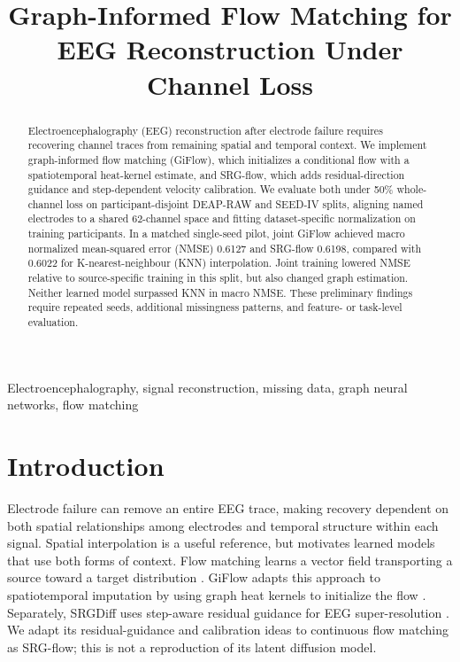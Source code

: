 \documentclass{article}
\title{Graph-Informed Flow Matching for EEG Reconstruction Under Channel Loss}
\begin{document}
\maketitle

\begin{abstract}
Electroencephalography (EEG) reconstruction after electrode failure requires
recovering channel traces from remaining spatial and temporal context. We
implement graph-informed flow matching (GiFlow), which initializes a
conditional flow with a spatiotemporal heat-kernel estimate, and SRG-flow,
which adds residual-direction guidance and step-dependent velocity
calibration. We evaluate both under 50\% whole-channel loss on
participant-disjoint DEAP-RAW and SEED-IV splits, aligning named electrodes
to a shared 62-channel space and fitting dataset-specific normalization on
training participants. In a matched single-seed pilot, joint GiFlow achieved
macro normalized mean-squared error (NMSE) 0.6127 and SRG-flow 0.6198,
compared with 0.6022 for K-nearest-neighbour (KNN) interpolation. Joint
training lowered NMSE relative to source-specific training in this split,
but also changed graph estimation. Neither learned model surpassed KNN in
macro NMSE. These preliminary findings require repeated seeds, additional
missingness patterns, and feature- or task-level evaluation.
\end{abstract}

\begin{keywords}
Electroencephalography, signal reconstruction, missing data, graph neural
networks, flow matching
\end{keywords}

\section{Introduction}

Electrode failure can remove an entire EEG trace, making recovery dependent
on both spatial relationships among electrodes and temporal structure within
each signal. Spatial interpolation is a useful reference, but motivates
learned models that use both forms of context. Flow matching learns a vector
field transporting a source toward a target distribution \cite{lipman2023flow}.
GiFlow adapts this approach to spatiotemporal imputation by using graph heat
kernels to initialize the flow \cite{zhang2026giflow}. Separately, SRGDiff
uses step-aware residual guidance for EEG super-resolution
\cite{liu2026srgdiff}. We adapt its residual-guidance and calibration ideas
to continuous flow matching as SRG-flow; this is not a reproduction of its
latent diffusion model.
\end{document}
